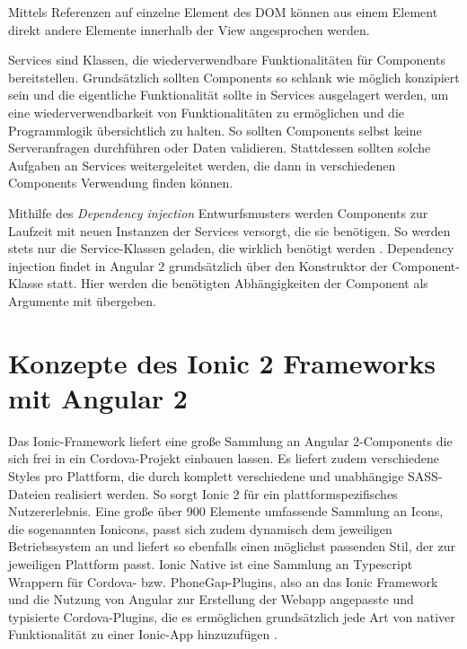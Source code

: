 Mittels Referenzen auf einzelne Element des DOM können aus einem Element direkt andere Elemente innerhalb der View angesprochen werden.

Services sind Klassen, die wiederverwendbare Funktionalitäten für Components bereitstellen. Grundsätzlich sollten Components so schlank wie möglich konzipiert sein und die eigentliche Funktionalität sollte in Services ausgelagert werden, um eine wiederverwendbarkeit von Funktionalitäten zu ermöglichen und die Programmlogik übersichtlich zu halten. So sollten Components selbst keine Serveranfragen durchführen oder Daten validieren. Stattdessen sollten solche Aufgaben an Services weitergeleitet werden, die dann in verschiedenen Components Verwendung finden können.
%

Mithilfe des \emph{Dependency injection} Entwurfsmusters \cite{angularDependencyInjectionDoku} werden Components zur Laufzeit mit neuen Instanzen der Services versorgt, die sie benötigen. So werden stets nur die Service-Klassen geladen, die wirklich benötigt werden \cite{angularDocuBasicArchitecture}. Dependency injection findet in Angular 2 grundsätzlich über den Konstruktor der Component-Klasse statt. Hier werden die benötigten Abhängigkeiten der Component als Argumente mit übergeben.
%
%
\section{Konzepte des Ionic 2 Frameworks mit Angular 2}
\label{sec:ionicKonzepte}

Das Ionic-Framework liefert eine große Sammlung an Angular 2-Components die sich frei in ein Cordova-Projekt einbauen lassen. Es liefert zudem verschiedene Styles pro Plattform, die durch komplett verschiedene und unabhängige SASS-Dateien realisiert werden. So sorgt Ionic 2 für ein plattformspezifisches Nutzererlebnis. Eine große über 900 Elemente umfassende Sammlung an Icons, die sogenannten Ionicons, passt sich zudem dynamisch dem jeweiligen Betriebssystem an und liefert so ebenfalls einen möglichst passenden Stil, der zur jeweiligen Plattform passt. Ionic Native ist eine Sammlung an Typescript Wrappern für Cordova- bzw. PhoneGap-Plugins, also an das Ionic Framework und die Nutzung von Angular zur Erstellung der Webapp angepasste und typisierte Cordova-Plugins, die es ermöglichen grundsätzlich jede Art von nativer Funktionalität zu einer Ionic-App hinzuzufügen \cite{ionic2Docu}.

